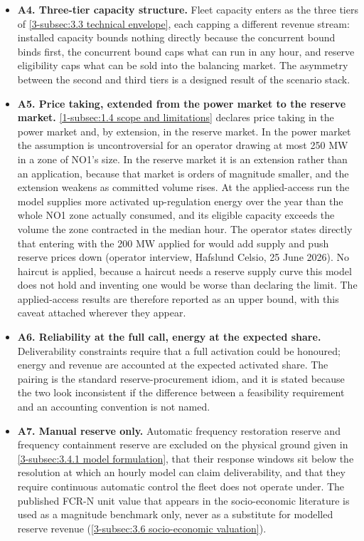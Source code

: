 \begin{itemize}
    \item \textbf{A4. Three-tier capacity structure.} Fleet capacity enters as the three tiers of \autoref{3-subsec:3.3 technical envelope}, each capping a different revenue stream: installed capacity bounds nothing directly because the concurrent bound binds first, the concurrent bound caps what can run in any hour, and reserve eligibility caps what can be sold into the balancing market. The asymmetry between the second and third tiers is a designed result of the scenario stack.

    \item \textbf{A5. Price taking, extended from the power market to the reserve market.} \autoref{1-subsec:1.4 scope and limitations} declares price taking in the power market and, by extension, in the reserve market. In the power market the assumption is uncontroversial for an operator drawing at most 250 MW in a zone of NO1's size. In the reserve market it is an extension rather than an application, because that market is orders of magnitude smaller, and the extension weakens as committed volume rises. At the applied-access run the model supplies more activated up-regulation energy over the year than the whole NO1 zone actually consumed, and its eligible capacity exceeds the volume the zone contracted in the median hour. The operator states directly that entering with the 200 MW applied for would add supply and push reserve prices down (operator interview, Hafslund Celsio, 25 June 2026). No haircut is applied, because a haircut needs a reserve supply curve this model does not hold and inventing one would be worse than declaring the limit. The applied-access results are therefore reported as an upper bound, with this caveat attached wherever they appear.

    \item \textbf{A6. Reliability at the full call, energy at the expected share.} Deliverability constraints require that a full activation could be honoured; energy and revenue are accounted at the expected activated share. The pairing is the standard reserve-procurement idiom, and it is stated because the two look inconsistent if the difference between a feasibility requirement and an accounting convention is not named.

    \item \textbf{A7. Manual reserve only.} Automatic frequency restoration reserve and frequency containment reserve are excluded on the physical ground given in \autoref{3-subsec:3.4.1 model formulation}, that their response windows sit below the resolution at which an hourly model can claim deliverability, and that they require continuous automatic control the fleet does not operate under. The published FCR-N unit value that appears in the socio-economic literature is used as a magnitude benchmark only, never as a substitute for modelled reserve revenue (\autoref{3-subsec:3.6 socio-economic valuation}).


\end{itemize}
